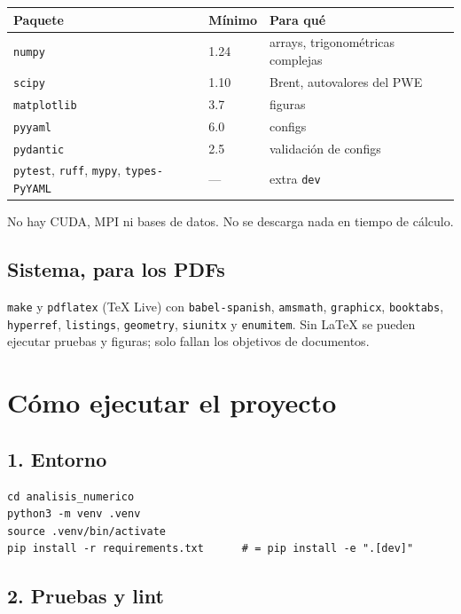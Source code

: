 \documentclass[11pt,a4paper]{article}
\begin{document}
\begin{center}
\begin{tabular}{lll}
\toprule
Paquete & Mínimo & Para qué \\
\midrule
\texttt{numpy} & 1.24 & arrays, trigonométricas complejas \\
\texttt{scipy} & 1.10 & Brent, autovalores del PWE \\
\texttt{matplotlib} & 3.7 & figuras \\
\texttt{pyyaml} & 6.0 & configs \\
\texttt{pydantic} & 2.5 & validación de configs \\
\texttt{pytest}, \texttt{ruff}, \texttt{mypy}, \texttt{types-PyYAML} & --- & extra \texttt{dev} \\
\bottomrule
\end{tabular}
\end{center}

No hay CUDA, MPI ni bases de datos. No se descarga nada en tiempo de
cálculo.

\subsection{Sistema, para los PDFs}

\texttt{make} y \texttt{pdflatex} (TeX Live) con \texttt{babel-spanish},
\texttt{amsmath}, \texttt{graphicx}, \texttt{booktabs}, \texttt{hyperref},
\texttt{listings}, \texttt{geometry}, \texttt{siunitx} y \texttt{enumitem}.
Sin LaTeX se pueden ejecutar pruebas y figuras; solo fallan los objetivos de
documentos.

\section{Cómo ejecutar el proyecto}

\subsection{1. Entorno}

\begin{lstlisting}
cd analisis_numerico
python3 -m venv .venv
source .venv/bin/activate
pip install -r requirements.txt      # = pip install -e ".[dev]"
\end{lstlisting}

\subsection{2. Pruebas y lint}
\end{document}
